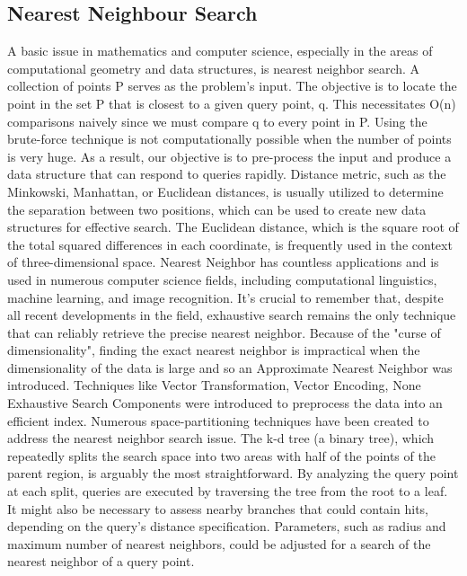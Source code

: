 \subsection{Nearest Neighbour Search}
A basic issue in mathematics and computer science, especially in the areas of computational geometry and data structures, is nearest neighbor search. A collection of points P serves as the problem's input. The objective is to locate the point in the set P that is closest to a given query point, q. This necessitates O(n) comparisons naively since we must compare q to every point in P. Using the brute-force technique is not computationally possible when the number of points is very huge. As a result, our objective is to pre-process the input and produce a data structure that can respond to queries rapidly. Distance metric, such as the Minkowski, Manhattan, or Euclidean distances, is usually utilized to determine the separation between two positions, which can be used to create new data structures for effective search. The Euclidean distance, which is the square root of the total squared differences in each coordinate, is frequently used in the context of three-dimensional space. Nearest Neighbor has countless applications and is used in numerous computer science fields, including computational linguistics, machine learning, and image recognition. It's crucial to remember that, despite all recent developments in the field, exhaustive search remains the only technique that can reliably retrieve the precise nearest neighbor. Because of the "curse of dimensionality", finding the exact nearest neighbor is impractical when the dimensionality of the data is large and so an Approximate Nearest Neighbor was introduced. Techniques like Vector Transformation, Vector Encoding, None Exhaustive Search Components were introduced to preprocess the data into an efficient index. Numerous space-partitioning techniques have been created to address the nearest neighbor search issue. The k-d tree (a binary tree), which repeatedly splits the search space into two areas with half of the points of the parent region, is arguably the most straightforward. By analyzing the query point at each split, queries are executed by traversing the tree from the root to a leaf. It might also be necessary to assess nearby branches that could contain hits, depending on the query's distance specification. Parameters, such as radius and maximum number of nearest neighbors, could be adjusted for a search of the nearest neighbor of a query point.
